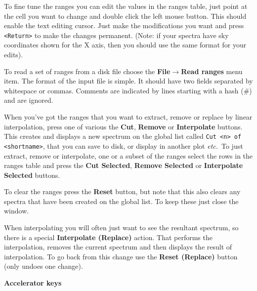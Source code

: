 \documentclass[twoside,11pt]{article}
\newcommand{\latexhtml}[2]{#1}
\renewcommand{\_}{\texttt{\symbol{95}}}
\newcommand{\submenuitem}[2]{\latexhtml{\textbf{#1$\rightarrow$#2}}{\textbf{#1->#2}}}
\newcommand{\labelitem}[1]{\textbf{#1}}
\newcommand{\hitext}[1]{\texttt{#1}}
\newcommand{\etc}{\textit{etc.}}
\newcommand{\subheading}[1]{\textbf{\large{#1}}}
\begin{document}
To fine tune the ranges you can edit the values in the ranges table,
just point at the cell you want to change and double click the left
mouse button. This should enable the text editing cursor. Just make
the modifications you want and press \hitext{<Return>} to make the
changes permanent. (Note: if your spectra have sky coordinates shown
for the X axis, then you should use the same format for your edits).

To read a set of ranges from a disk file choose the
\submenuitem{File}{Read ranges} menu item. The format of the input file
is simple. It should have two fields separated by whitespace or
commas. Comments are indicated by lines starting with a hash (\#)
and are ignored.

When you've got the ranges that you want to extract, remove or replace by
linear interpolation, press one of various the \labelitem{Cut},
\labelitem{Remove} or \labelitem{Interpolate} buttons. This creates and
displays a new spectrum on the global list called \hitext{Cut <n> of
<shortname>}, that you can save to disk, or display in another plot \etc\ To
just extract, remove or interpolate, one or a subset of the ranges select the
rows in the ranges table and press the \labelitem{Cut Selected},
\labelitem{Remove Selected} or \labelitem{Interpolate Selected} buttons.

To clear the ranges press the \labelitem{Reset} button, but note that
this also clears any spectra that have been created on the global
list. To keep these just close the window.

When interpolating you will often just want to see the resultant spectrum,
so there is a special \labelitem{Interpolate (Replace)} action. That performs
the interpolation, removes the current spectrum and then displays the
result of interpolation. To go back from this change use the
\labelitem{Reset (Replace)} button (only undoes one change).

\subheading{Accelerator keys}
\end{document}
